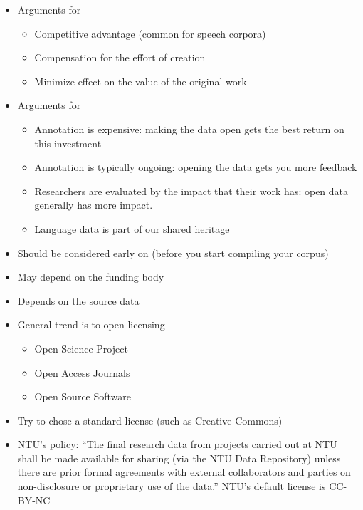 \documentclass[a4paper,landscape,headrule,footrule,xetex]{foils}
\begin{document}
\MyLogo{}
\begin{itemize}
\item Arguments for 
  \begin{itemize}
  \item Competitive advantage (common for speech corpora)
  \item Compensation for the effort of creation
  \item Minimize effect on the value of the original work
  \end{itemize}
\item Arguments for 
  \begin{itemize}
  \item Annotation is expensive: making the data open gets the best
    return on this investment
  \item Annotation is typically ongoing: opening the data gets you
    more feedback
 \item Researchers are evaluated by the impact that their work has: open data generally has more impact.
  \item Language data is part of our shared heritage
  \end{itemize}
\end{itemize}

\begin{itemize}
\item Should be considered early on (before you start compiling your corpus)
\item May depend on the funding body
\item Depends on the source data
\item General trend is to open licensing
  \begin{itemize}
  \item Open Science Project
  \item Open Access Journals
  \item Open Source Software
  \end{itemize}
\item Try to chose a standard license (such as Creative Commons)
\item \href{http://research.ntu.edu.sg/rieo/RI/Pages/Research-Data-Policies.aspx}{NTU's policy}: ``The final research data from projects carried out
  at NTU shall be made available for sharing (via the NTU Data
  Repository) unless there are prior formal agreements with external
  collaborators and parties on non-disclosure or proprietary use of
  the data.''  NTU's default license is CC-BY-NC 

\end{itemize}
\end{document}
